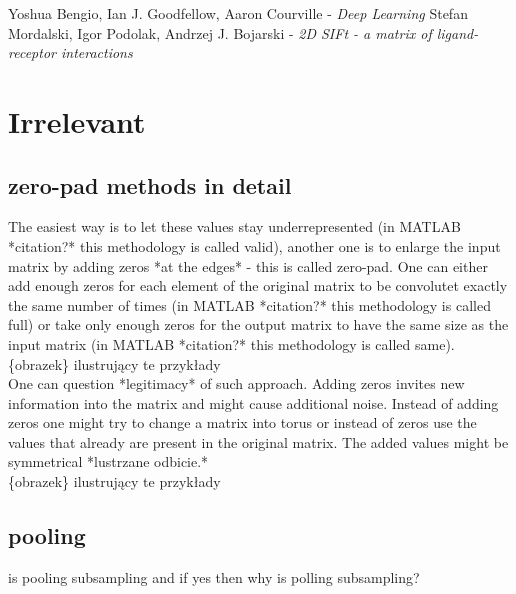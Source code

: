 \documentclass[a4paper,10pt]{report}
\begin{document}
  \begin{thebibliography}{99}
      Yoshua Bengio, Ian J. Goodfellow, Aaron Courville - \emph{Deep Learning}
      Stefan Mordalski, Igor Podolak, Andrzej J. Bojarski - \emph{2D SIFt - a matrix of ligand-receptor interactions}
    
  \end{thebibliography}
  
  \chapter{Irrelevant} %
    \section{zero-pad methods in detail}
      The easiest way is to let these values stay underrepresented (in MATLAB *citation?* this methodology is called valid), another one is to enlarge the input matrix by adding zeros *at the edges* - this is called zero-pad. One can either add enough zeros for each element of the original matrix to be convolutet exactly the same number of times (in MATLAB *citation?* this methodology is called full) or take only enough zeros for the output matrix to have the same size as the input matrix (in MATLAB *citation?* this methodology is called same).\\
	  
      \{obrazek\} ilustrujący te przykłady \\
	  
      One can question *legitimacy* of such approach. Adding zeros invites new information into the matrix and might cause additional noise. Instead of adding zeros one might try to change a matrix into torus or instead of zeros use the values that already are present in the original matrix. The added values might be symmetrical *lustrzane odbicie.*\\
	  
      \{obrazek\} ilustrujący te przykłady 
      
    \section{pooling}	  
      is pooling subsampling and if yes then why is polling subsampling?\\

    
\end{document}
